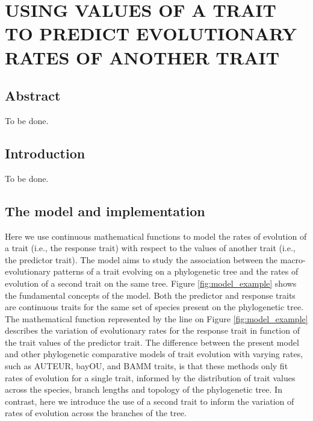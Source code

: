 
\chapter{USING VALUES OF A TRAIT TO PREDICT EVOLUTIONARY RATES OF ANOTHER TRAIT}

\section{Abstract}

To be done.

\section{Introduction}

To be done.

\section{ The model and implementation }

Here we use continuous mathematical functions to model the rates of evolution of a trait (i.e., the response trait) with respect to the values of another trait (i.e., the predictor trait). The model aims to study the association between the macro-evolutionary patterns of a trait evolving on a phylogenetic tree and the rates of evolution of a second trait on the same tree. Figure \ref{fig:model_example} shows the fundamental concepts of the model. %
Both the predictor and response traits are continuous traits for the same set of species present on the phylogenetic tree. The mathematical function represented by the line on Figure \ref{fig:model_example} describes the variation of evolutionary rates for the response trait in function of the trait values of the predictor trait. The difference between the present model and other phylogenetic comparative models of trait evolution with varying rates, such as AUTEUR, bayOU, and BAMM traits, is that these methods only fit rates of evolution for a single trait, informed by the distribution of trait values across the species, branch lengths and topology of the phylogenetic tree. In contrast, here we introduce the use of a second trait to inform the variation of rates of evolution across the branches of the tree.

